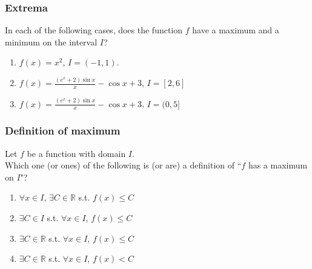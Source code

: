 \documentclass[14pt]{beamer}
\begin{document}
\begin{frame}
	\frametitle{Extrema}

	In each of the following cases, does the function $f$ have a maximum and a minimum
	on the interval $I$?

	\begin{enumerate}
		\item $\displaystyle f(x) = x^{2}$, \quad $\displaystyle I = (-1,1)$.

		\item $\displaystyle f(x) = \frac{(e^{x}+ 2) \sin x}{x}- \cos x + 3$, \quad
			$\displaystyle I = [2,6]$

		\item $\displaystyle f(x) = \frac{(e^{x}+ 2) \sin x}{x}- \cos x + 3$, \quad
			$\displaystyle I = (0,5]$
	\end{enumerate}
\end{frame}

\begin{frame}
	\frametitle{Definition of maximum}

	Let $f$ be a function with domain $I$. \\ Which one (or ones) of the following
	is (or are) a definition of \quad ``$f$ has a maximum on $I$"?

	\begin{enumerate}
		\item $\displaystyle \forall x \in I$,
			$\displaystyle \exists C \in \mathbb{R}$ s.t. $\displaystyle f(x) \leq C$

		\item $\displaystyle \exists C \in I$ s.t. $\displaystyle \forall x \in I$, $\displaystyle
			f(x) \leq C$

		\item $\displaystyle \exists C \in \mathbb{R}$ s.t.
			$\displaystyle \forall x \in I$, $\displaystyle f(x) \leq C$

		\item $\displaystyle \exists C \in \mathbb{R}$ s.t.
			$\displaystyle \forall x \in I$, $\displaystyle f(x) < C$
	\end{enumerate}
\end{frame}
\end{document}

